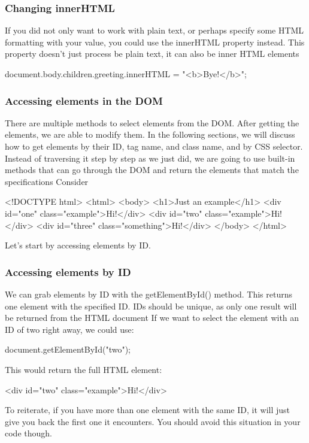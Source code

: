 \documentclass{report}
\begin{document}
\begin{jscode}
\bigbreak \noindent 
\subsubsection{Changing innerHTML}
\bigbreak \noindent 
If you did not only want to work with plain text, or perhaps specify some HTML
formatting with your value, you could use the innerHTML property instead. This
property doesn't just process be plain text, it can also be inner HTML elements
\bigbreak \noindent 
\begin{jscode}
document.body.children.greeting.innerHTML = "<b>Bye!</b>";
\end{jscode}

\bigbreak \noindent 
\subsubsection{Accessing elements in the DOM}
\bigbreak \noindent 
There are multiple methods to select elements from the DOM. After getting the
elements, we are able to modify them. In the following sections, we will discuss how
to get elements by their ID, tag name, and class name, and by CSS selector.
\bigbreak \noindent 
Instead of traversing it step by step as we just did, we are going to use built-in
methods that can go through the DOM and return the elements that match the
specifications
\bigbreak \noindent 
Consider 
\bigbreak \noindent 
\begin{htmlcode}
    <!DOCTYPE html>
    <html>
        <body>
            <h1>Just an example</h1>
            <div id="one" class="example">Hi!</div>
            <div id="two" class="example">Hi!</div>
            <div id="three" class="something">Hi!</div>
        </body>
    </html>
\end{htmlcode}
\bigbreak \noindent 
Let's start by accessing elements by ID.
\bigbreak \noindent 
\subsubsection{Accessing elements by ID}
\bigbreak \noindent 
We can grab elements by ID with the getElementById() method. This returns one
element with the specified ID. IDs should be unique, as only one result will be
returned from the HTML document
\bigbreak \noindent 
If we want to select the element with an ID of two right away, we could use:
\bigbreak \noindent 
\begin{jscode}
document.getElementById("two");
\end{jscode}
\bigbreak \noindent 
This would return the full HTML element:
\bigbreak \noindent 
\begin{htmlcode}
<div id="two" class="example">Hi!</div>
\end{htmlcode}
\bigbreak \noindent 
To reiterate, if you have more than one element with the same ID, it will just give
you back the first one it encounters. You should avoid this situation in your code
though.
\bigbreak \noindent 

\end{jscode}
\end{document}
